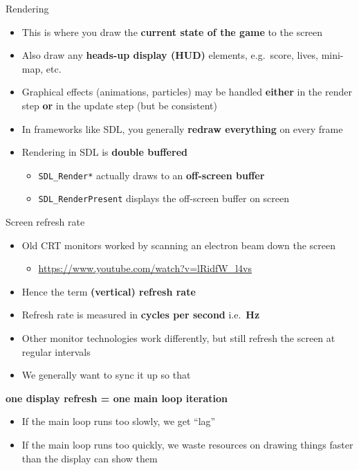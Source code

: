 \begin{frame}{Rendering}
    \begin{itemize}
        \item This is where you draw the \textbf{current state of the game} to the screen
        \item Also draw any \textbf{heads-up display (HUD)} elements, e.g.\ score, lives, mini-map, etc.
        \item Graphical effects (animations, particles) may be handled \textbf{either} in the render step
            \textbf{or} in the update step (but be consistent)
        \item In frameworks like SDL, you generally \textbf{redraw everything} on every frame
        \item Rendering in SDL is \textbf{double buffered}
            \begin{itemize}
                \item \lstinline{SDL_Render*} actually draws to an \textbf{off-screen buffer}
                \item \lstinline{SDL_RenderPresent} displays the off-screen buffer on screen
            \end{itemize}
    \end{itemize}
\end{frame}

\begin{frame}{Screen refresh rate}
    \begin{itemize}
        \item Old CRT monitors worked by scanning an electron beam down the screen
            \begin{itemize}
                \item \url{https://www.youtube.com/watch?v=lRidfW_l4vs}
            \end{itemize}
        \item Hence the term \textbf{(vertical) refresh rate}
        \item Refresh rate is measured in \textbf{cycles per second} i.e.\ \textbf{Hz}
        \item Other monitor technologies work differently, but still refresh the screen at regular intervals
        \item We generally want to sync it up so that
    \end{itemize}
    \begin{center}
        \textbf{one display refresh = one main loop iteration}
    \end{center}
    \begin{itemize}
        \item If the main loop runs too slowly, we get ``lag''
        \item If the main loop runs too quickly, we waste resources on drawing things faster than the display can show them
    \end{itemize}
\end{frame}

